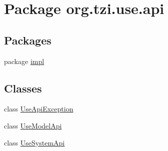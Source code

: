 \hypertarget{namespaceorg_1_1tzi_1_1use_1_1api}{\section{Package org.\-tzi.\-use.\-api}
\label{namespaceorg_1_1tzi_1_1use_1_1api}
}
\subsection*{Packages}
\begin{DoxyCompactItemize}
\item 
package \hyperlink{namespaceorg_1_1tzi_1_1use_1_1api_1_1impl}{impl}
\end{DoxyCompactItemize}
\subsection*{Classes}
\begin{DoxyCompactItemize}
\item 
class \hyperlink{classorg_1_1tzi_1_1use_1_1api_1_1_use_api_exception}{Use\-Api\-Exception}
\item 
class \hyperlink{classorg_1_1tzi_1_1use_1_1api_1_1_use_model_api}{Use\-Model\-Api}
\item 
class \hyperlink{classorg_1_1tzi_1_1use_1_1api_1_1_use_system_api}{Use\-System\-Api}
\end{DoxyCompactItemize}
